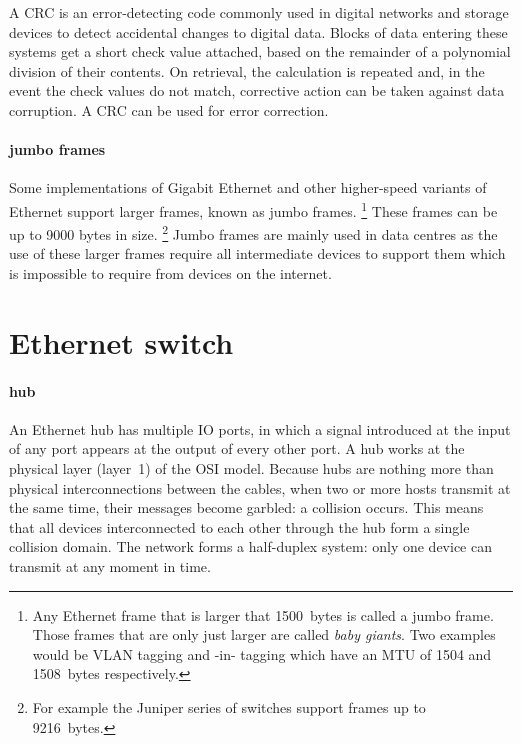 A \acs{CRC} is an error-detecting code commonly used in digital networks and storage devices to detect accidental changes to digital data.
Blocks of data entering these systems get a short check value attached, based on the remainder of a polynomial division of their contents.
On retrieval, the calculation is repeated and, in the event the check values do not match, corrective action can be taken against data corruption.
A \acs{CRC} can be used for error correction.

\paragraph{jumbo frames} 
Some implementations of Gigabit Ethernet and other higher-speed variants of Ethernet support larger frames, known as jumbo frames.%
   \footnote{%
      Any Ethernet frame that is larger that {1500}~bytes is called a jumbo frame.
      Those frames that are only just larger are called \emph{baby giants}.
      Two examples would be \acs{VLAN} tagging and -in- tagging which have an \acs{MTU} of {1504} and {1508}~bytes respectively.}
These frames can be up to 9000 bytes in size.%
   \footnote{For example the Juniper  series of switches support frames up to {9216}~bytes.}
Jumbo frames are mainly used in data centres as the use of these larger frames require all intermediate devices to support them which is impossible to require from devices on the internet.






\section{Ethernet switch}
\label{sec:ethernet-switch}

\paragraph{hub}
An Ethernet hub has multiple \ac{IO} ports, in which a signal introduced at the input of any port appears at the output of every other port.
A hub works at the physical layer (layer~1) of the \ac{OSI} model.
Because hubs are nothing more than physical interconnections between the cables, when two or more hosts transmit at the same time, their messages become garbled: a collision occurs.
This means that all devices interconnected to each other through the hub form a single collision domain.
The network forms a half-duplex system: only one device can transmit at any moment in time.

